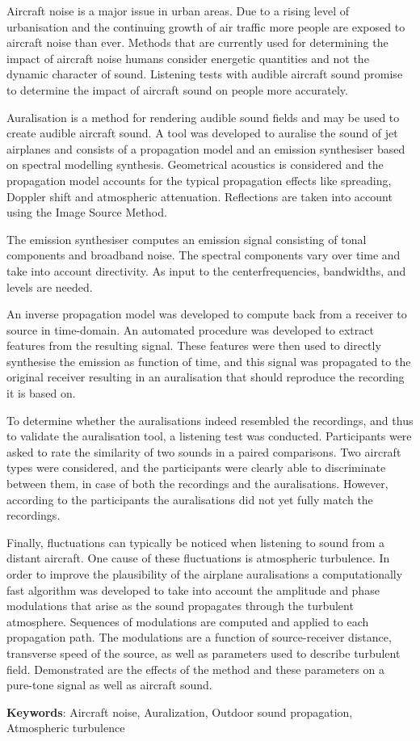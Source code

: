 Aircraft noise is a major issue in urban areas. Due to a rising level of
urbanisation and the continuing growth of air traffic more people are exposed to
aircraft noise than ever. Methods that are currently used for determining the
impact of aircraft noise humans consider energetic quantities and not the
dynamic character of sound. Listening tests with audible aircraft sound promise
to determine the impact of aircraft sound on people more accurately.

Auralisation is a method for rendering audible sound fields and may be used to
create audible aircraft sound. A tool was developed to auralise the sound of jet
airplanes and consists of a propagation model and an emission synthesiser based
on spectral modelling synthesis. Geometrical acoustics is considered and the
propagation model accounts for the typical propagation effects like spreading,
Doppler shift and atmospheric attenuation. Reflections are taken into account
using the Image Source Method.

The emission synthesiser computes an emission signal consisting of tonal
components and broadband noise. The spectral components vary over time and take
into account directivity. As input to the centerfrequencies, bandwidths, and
levels are needed.

An inverse propagation model was developed to compute back from a receiver to
source in time-domain. An automated procedure was developed to extract features
from the resulting signal. These features were then used to directly synthesise
the emission as function of time, and this signal was propagated to the original
receiver resulting in an auralisation that should reproduce the recording
it is based on.

To determine whether the auralisations indeed resembled the recordings, and thus
to validate the auralisation tool, a listening test was conducted. Participants
were asked to rate the similarity of two sounds in a paired comparisons. Two
aircraft types were considered, and the participants were clearly able to
discriminate between them, in case of both the recordings and the auralisations.
However, according to the participants the auralisations did not yet fully match
the recordings.


Finally, fluctuations can typically be noticed when listening to sound from a
distant aircraft. One cause of these fluctuations is atmospheric turbulence. In
order to improve the plausibility of the airplane auralisations a
computationally fast algorithm was developed to take into account the amplitude
and phase modulations that arise as the sound propagates through the turbulent
atmosphere. Sequences of modulations are computed and applied to each
propagation path. The modulations are a function of source-receiver distance,
transverse speed of the source, as well as parameters used to describe turbulent
field. Demonstrated are the effects of the method and these parameters on a
pure-tone signal as well as aircraft sound.



\vspace{0.1cm}

\textbf{Keywords}: Aircraft noise, Auralization, Outdoor sound propagation, Atmospheric turbulence
